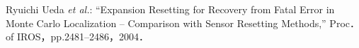 \documentclass[twocolumn,9pt]{jsproceedings}
\begin{document}
\begin{thebibliography}{99}
  Ryuichi Ueda {\it et al.}: 
  ``Expansion Resetting for Recovery from Fatal Error in Monte Carlo Localization -- Comparison with Sensor Resetting Methods,'' Proc．of IROS，pp.2481--2486，2004．












  







\end{thebibliography}
\end{document}
